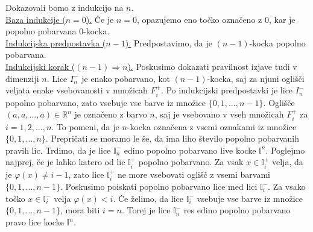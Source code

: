 \documentclass[mat1]{fmfdelo}
\newcommand{\R}{\mathbb R}
\newcommand{\I}{\mathbb I}
\newcommand{\0}{\underline{0}}
\begin{document}
\begin{dokaz}
\begin{figure}[h!]
\end{figure}
%
Dokazovali bomo z indukcijo na $n$.\\
\underline{Baza indukcije ($n = 0$).}
Če je $n=0$, opazujemo eno točko označeno z $0$, kar je popolno pobarvana $0$-kocka.\\
\underline{Indukcijska predpostavka ($n - 1$).}
Predpostavimo, da je $(n-1)$-kocka popolno pobarvana. \\
\underline{Indukcijski korak ($(n - 1) \Longrightarrow n$).}
Poskusimo dokazati pravilnost izjave tudi v dimenziji $n$. Lice $I_n^-$ je enako pobarvano, kot $(n-1)$-kocka, saj za njuni oglišči veljata enake vsebovanosti v množicah $F_i^+$. Po indukcijski predpostavki je lice $I_n^-$ popolno pobarvano, zato vsebuje vse barve iz množice $\{ 0, 1, \dots, n-1\}$. Oglišče $(a, a, \dots, a) \in \R^n$ je označeno z barvo $n$, saj je vsebovano v vseh množicah $F_i^+$ za $i = 1, 2, \dots, n$. To pomeni, da je $n$-kocka označena z vsemi oznakami iz množice $\{ 0, 1, \dots, n \}$. Prepričati se moramo le še, da ima liho število popolno pobarvanih pravih lic. 
Trdimo, da je lice $\I_n^-$ edino popolno pobarvano live kocke $\I^n$. Poglejmo najprej, če je lahko katero od lic $\I_i^+$ popolno pobarvano. Za vsak $x \in \I_i^+$ velja, da je $\varphi (x) \neq i-1$, zato lice $\I_i^+$ ne more vsebovati oglišč z vsemi barvami $\{ 0, 1, \dots, n - 1 \}$. Poskusimo poiskati popolno pobarvano lice med lici $\I_i^-$. Za vsako točko $x \in \I_i^-$ velja $\varphi (x) < i$. Če želimo, da lice $\I_i^-$ vsebuje vse barve iz množice $\{ 0, 1, \dots, n - 1 \}$, mora biti $i = n$. Torej je lice $\I_n^-$ res edino popolno pobarvano pravo lice kocke $\I^n$.


\end{dokaz}
\end{document}
